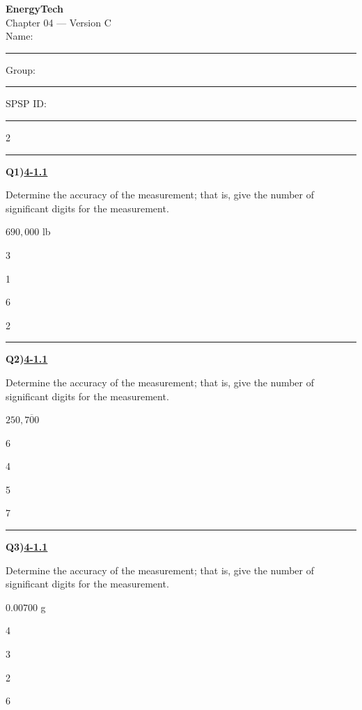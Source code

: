 \documentclass[11pt]{article}
\newenvironment{Qbox}[2]{%
  \par\medskip\noindent\begin{minipage}{\linewidth}%
  \hrule\medskip%
  \textbf{Q#1)}\hfill\textbf{\underline{#2}}\par\smallskip%
}{\par\end{minipage}\par\medskip}
\begin{document}
\begin{center}
  {\LARGE\bfseries EnergyTech}\\[2pt]
  {\Large Chapter 04 --- Version C}\\[6pt]
  Name: \rule{4.5cm}{0.4pt}\quad Group: \rule{3cm}{0.4pt}\quad SPSP ID: \rule{3.5cm}{0.4pt}
\end{center}

\begin{multicols}{2}
\raggedcolumns
\begin{Qbox}{1}{4-1.1}
Determine the accuracy of the measurement; that is, give the number of significant digits for the measurement.\par\medskip $690{,}000$ lb
\begin{choices}
  \item 3
  \item 1
  \item 6
  \item 2
\end{choices}
\end{Qbox}

\begin{Qbox}{2}{4-1.1}
Determine the accuracy of the measurement; that is, give the number of significant digits for the measurement.\par\medskip $250{,}7\overline{0}0$
\begin{choices}
  \item 6
  \item 4
  \item 5
  \item 7
\end{choices}
\end{Qbox}

\begin{Qbox}{3}{4-1.1}
Determine the accuracy of the measurement; that is, give the number of significant digits for the measurement.\par\medskip $0.00700$ g
\begin{choices}
  \item 4
  \item 3
  \item 2
  \item 6
\end{choices}
\end{Qbox}


\end{multicols}
\end{document}
